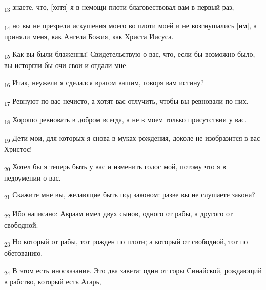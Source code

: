 \begin{tcolorbox}
\textsubscript{13} знаете, что, [хотя] я в немощи плоти благовествовал вам в первый раз,
\end{tcolorbox}
\begin{tcolorbox}
\textsubscript{14} но вы не презрели искушения моего во плоти моей и не возгнушались [им], а приняли меня, как Ангела Божия, как Христа Иисуса.
\end{tcolorbox}
\begin{tcolorbox}
\textsubscript{15} Как вы были блаженны! Свидетельствую о вас, что, если бы возможно было, вы исторгли бы очи свои и отдали мне.
\end{tcolorbox}
\begin{tcolorbox}
\textsubscript{16} Итак, неужели я сделался врагом вашим, говоря вам истину?
\end{tcolorbox}
\begin{tcolorbox}
\textsubscript{17} Ревнуют по вас нечисто, а хотят вас отлучить, чтобы вы ревновали по них.
\end{tcolorbox}
\begin{tcolorbox}
\textsubscript{18} Хорошо ревновать в добром всегда, а не в моем только присутствии у вас.
\end{tcolorbox}
\begin{tcolorbox}
\textsubscript{19} Дети мои, для которых я снова в муках рождения, доколе не изобразится в вас Христос!
\end{tcolorbox}
\begin{tcolorbox}
\textsubscript{20} Хотел бы я теперь быть у вас и изменить голос мой, потому что я в недоумении о вас.
\end{tcolorbox}
\begin{tcolorbox}
\textsubscript{21} Скажите мне вы, желающие быть под законом: разве вы не слушаете закона?
\end{tcolorbox}
\begin{tcolorbox}
\textsubscript{22} Ибо написано: Авраам имел двух сынов, одного от рабы, а другого от свободной.
\end{tcolorbox}
\begin{tcolorbox}
\textsubscript{23} Но который от рабы, тот рожден по плоти; а который от свободной, тот по обетованию.
\end{tcolorbox}
\begin{tcolorbox}
\textsubscript{24} В этом есть иносказание. Это два завета: один от горы Синайской, рождающий в рабство, который есть Агарь,
\end{tcolorbox}
